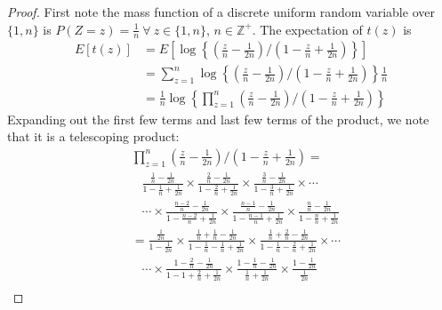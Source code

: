 \documentclass[12pt]{article}
\theoremstyle{plain}
\theoremstyle{remark}
\begin{document}
\begin{appendix}

\begin{proof}
First note the mass function of a discrete uniform random variable over $\{1, n\}$ is $P(Z = z) = \frac{1}{n}\ \forall\ z \in \{1, n\}$, $n \in \mathbb{Z}^+$. The expectation of $t(z)$ is
\begin{align*}
	E\left[ t(z) \right] &= E\left[ \log \left\{\left(\frac{z}{n} - \frac{1}{2n}\right) \bigg/ \left(1-\frac{z}{n} + \frac{1}{2n}\right) \right\} \right] \\
	&= \sum_{z = 1}^n \log \left\{\left(\frac{z}{n} - \frac{1}{2n}\right) \bigg/ \left(1-\frac{z}{n} + \frac{1}{2n}\right) \right\} \frac{1}{n}\\
	&= \frac{1}{n} \log \left\{ \prod_{z = 1}^n \left(\frac{z}{n} - \frac{1}{2n}\right) \bigg/ \left(1-\frac{z}{n} + \frac{1}{2n}\right) \right\} 
\end{align*}
Expanding out the first few terms and last few terms of the product, we note that it is a telescoping product:
\begin{align*}
	&\prod_{z = 1}^n \left(\frac{z}{n} - \frac{1}{2n}\right) \bigg/ \left(1-\frac{z}{n} + \frac{1}{2n}\right) = \\
	&\hspace{10pt} \frac{\frac{1}{n} - \frac{1}{2n}}{1-\frac{1}{n} + \frac{1}{2n}} \times \frac{\frac{2}{n} - \frac{1}{2n}}{1-\frac{2}{n} + \frac{1}{2n}} \times \frac{\frac{3}{n} - \frac{1}{2n}}{1-\frac{3}{n} + \frac{1}{2n}} \times \cdots\\
	&\hspace{10pt}\cdots \times \frac{\frac{n-2}{n} - \frac{1}{2n}}{1-\frac{n-2}{n} + \frac{1}{2n}} \times \frac{\frac{n-1}{n} - \frac{1}{2n}}{1-\frac{n-1}{n} + \frac{1}{2n}} \times \frac{\frac{n}{n} - \frac{1}{2n}}{1-\frac{n}{n} + \frac{1}{2n}}\\
	&= \frac{\frac{1}{2n}}{1-\frac{1}{2n}} \times \frac{\frac{1}{n} + \frac{1}{n} - \frac{1}{2n}}{1-\frac{1}{n} -\frac{1}{n} + \frac{1}{2n}} \times \frac{\frac{1}{n} + \frac{2}{n} - \frac{1}{2n}}{1-\frac{1}{n} - \frac{2}{n} + \frac{1}{2n}} \times \cdots\\
	&\hspace{10pt}\cdots \times \frac{1 - \frac{2}{n} - \frac{1}{2n}}{1- 1 + \frac{2}{n} + \frac{1}{2n}} \times \frac{1 -\frac{1}{n} - \frac{1}{2n}}{\frac{1}{n} + \frac{1}{2n}} \times \frac{1 - \frac{1}{2n}}{\frac{1}{2n}}\\

\end{align*}
\end{proof}
\end{appendix}
\end{document}
